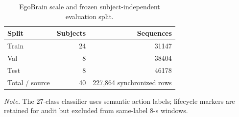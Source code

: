 \begin{table}[t]
\centering
\caption{EgoBrain scale and frozen subject-independent evaluation split.}
\label{tab:dataset}
\begin{tabular}{lrr}
\toprule
Split & Subjects & Sequences \\
\midrule
Train & 24 & 31147 \\
Val & 8 & 38404 \\
Test & 8 & 46178 \\
Total / source & 40 & 227,864 synchronized rows \\
\bottomrule
\end{tabular}
\par\smallskip\noindent\footnotesize\textit{Note.} The 27-class classifier uses semantic action labels; lifecycle markers are retained for audit but excluded from same-label 8-s windows.
\end{table}
